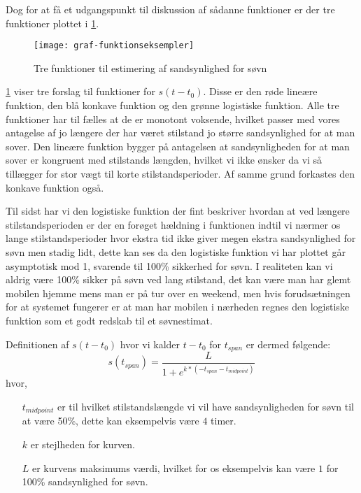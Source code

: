 Dog for at få et udgangspunkt til diskussion af sådanne funktioner er der tre funktioner plottet i \cref{fig:trefunc}.
\begin{figure}[h]
	\centering
	\texttt{[image: graf-funktionseksempler]}
	\caption{Tre funktioner til estimering af sandsynlighed for søvn}\label{fig:trefunc}
\end{figure}

\cref{fig:trefunc} viser tre forslag til funktioner for $s(t-t_0)$.
Disse er den røde lineære funktion, den blå konkave funktion og den grønne logistiske funktion.
Alle tre funktioner har til fælles at de er monotont voksende, hvilket passer med vores antagelse af jo længere der har været stilstand jo større sandsynlighed for at man sover.
Den lineære funktion bygger på antagelsen at sandsynligheden for at man sover er kongruent med stilstands længden, hvilket vi ikke ønsker da vi så tillægger for stor vægt til korte stilstandsperioder.
Af samme grund forkastes den konkave funktion også.

Til sidst har vi den logistiske funktion der fint beskriver hvordan at ved længere stilstandsperioden er der en forøget hældning i funktionen indtil vi nærmer os lange stilstandsperioder hvor ekstra tid ikke giver megen ekstra sandsynlighed for søvn men stadig lidt, dette kan ses da den logistiske funktion vi har plottet går asymptotisk mod 1, svarende til 100\% sikkerhed for søvn.
I realiteten kan vi aldrig være 100\% sikker på søvn ved lang stilstand, det kan være man har glemt mobilen hjemme mens man er på tur over en weekend, men hvis forudsætningen for at systemet fungerer er at man har mobilen i nærheden regnes den logistiske funktion som et godt redskab til et søvnestimat.

Definitionen af $s(t-t_0)$ hvor vi kalder $t-t_0$ for $t_{span}$ er dermed følgende:
\begin{equation}
	s(t_{span}) = \frac{L}{1+e^{k*(-t_{span} - t_{midpoint})}}
\end{equation} 
hvor,
\begin{itemize}
	\item[$t_{midpoint}$] er til hvilket stilstandslængde vi vil have sandsynligheden for søvn til at være 50\%, dette kan eksempelvis være $4$ timer.
	\item[$k$] er stejlheden for kurven.
	\item[$L$] er kurvens maksimums værdi, hvilket for os eksempelvis kan være $1$ for 100\% sandsynlighed for søvn.
\end{itemize}

